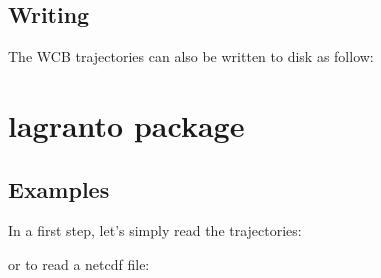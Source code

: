 \documentclass[a4paper,10pt,english]{sphinxmanual}
\begin{document}
\noindent{}


\section{Writing}
\label{\detokenize{tutorial_lagranto:writing}}
The WCB trajectories can also be written to disk as follow:

\begin{sphinxVerbatim}[commandchars=\\\{\}]
\end{sphinxVerbatim}


\chapter{lagranto package}
\label{\detokenize{lagranto:id1}}\label{\detokenize{lagranto:lagranto-package}}\label{\detokenize{lagranto::doc}}

\section{Examples}
\label{\detokenize{lagranto:examples}}
In a first step, let’s simply read the trajectories:

\begin{sphinxVerbatim}[commandchars=\\\{\}]
   
  
  
\end{sphinxVerbatim}

or to read a netcdf file:
\end{document}
